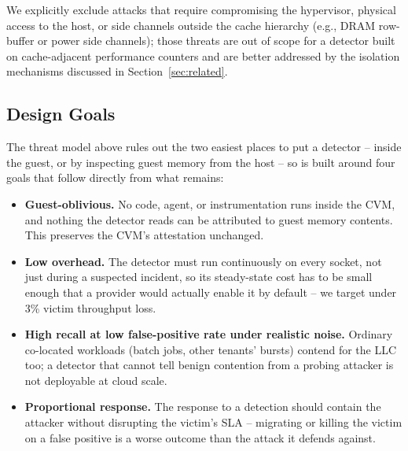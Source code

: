 We explicitly exclude attacks that require compromising the hypervisor, physical access to
the host, or side channels outside the cache hierarchy (e.g., DRAM row-buffer or power
side channels); those threats are out of scope for a detector built on cache-adjacent
performance counters and are better addressed by the isolation mechanisms discussed in
Section~\ref{sec:related}.

\subsection{Design Goals}

The threat model above rules out the two easiest places to put a detector -- inside the
guest, or by inspecting guest memory from the host -- so \sysname{} is built around four
goals that follow directly from what remains:

\begin{itemize}[leftmargin=1.4em]
  \item \textbf{Guest-oblivious.} No code, agent, or instrumentation runs inside the CVM, and
  nothing the detector reads can be attributed to guest memory contents. This preserves the
  CVM's attestation unchanged.
  \item \textbf{Low overhead.} The detector must run continuously on every socket, not just
  during a suspected incident, so its steady-state cost has to be small enough that a provider
  would actually enable it by default -- we target under 3\% victim throughput loss.
  \item \textbf{High recall at low false-positive rate under realistic noise.} Ordinary
  co-located workloads (batch jobs, other tenants' bursts) contend for the LLC too; a detector
  that cannot tell benign contention from a probing attacker is not deployable at cloud scale.
  \item \textbf{Proportional response.} The response to a detection should contain the
  attacker without disrupting the victim's SLA -- migrating or killing the victim on a
  false positive is a worse outcome than the attack it defends against.
\end{itemize}
